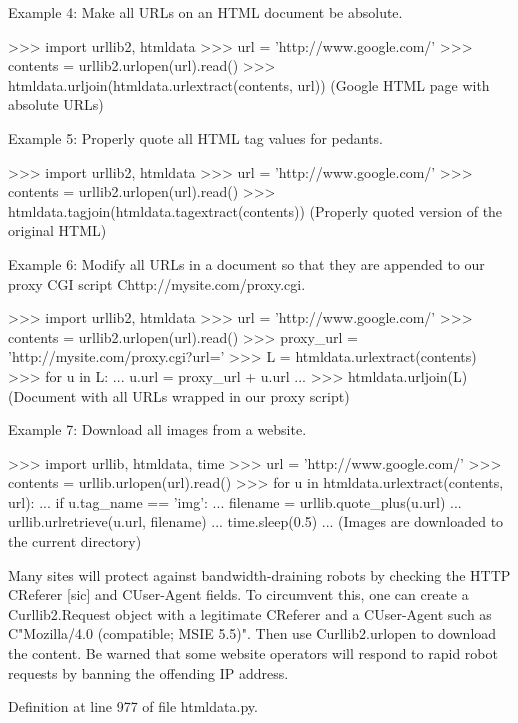 \begin{DoxyVerb}
Example 4:
Make all URLs on an HTML document be absolute.

 >>> import urllib2, htmldata
 >>> url = 'http://www.google.com/'
 >>> contents = urllib2.urlopen(url).read()
 >>> htmldata.urljoin(htmldata.urlextract(contents, url))
 (Google HTML page with absolute URLs)

Example 5:
Properly quote all HTML tag values for pedants.

 >>> import urllib2, htmldata
 >>> url = 'http://www.google.com/'
 >>> contents = urllib2.urlopen(url).read()
 >>> htmldata.tagjoin(htmldata.tagextract(contents))
 (Properly quoted version of the original HTML)

Example 6:
Modify all URLs in a document so that they are appended
to our proxy CGI script C{http://mysite.com/proxy.cgi}.

 >>> import urllib2, htmldata
 >>> url = 'http://www.google.com/'
 >>> contents = urllib2.urlopen(url).read()
 >>> proxy_url = 'http://mysite.com/proxy.cgi?url='
 >>> L = htmldata.urlextract(contents)
 >>> for u in L:
 ...   u.url = proxy_url + u.url
 ...
 >>> htmldata.urljoin(L)
 (Document with all URLs wrapped in our proxy script)

Example 7:
Download all images from a website.

 >>> import urllib, htmldata, time
 >>> url = 'http://www.google.com/'
 >>> contents = urllib.urlopen(url).read()
 >>> for u in htmldata.urlextract(contents, url):
 ...   if u.tag_name == 'img':
 ...     filename = urllib.quote_plus(u.url)
 ...     urllib.urlretrieve(u.url, filename)
 ...     time.sleep(0.5)
 ...
 (Images are downloaded to the current directory)

Many sites will protect against bandwidth-draining robots by
checking the HTTP C{Referer} [sic] and C{User-Agent} fields.
To circumvent this, one can create a C{urllib2.Request} object
with a legitimate C{Referer} and a C{User-Agent} such as
C{"Mozilla/4.0 (compatible; MSIE 5.5)"}.  Then use
C{urllib2.urlopen} to download the content.  Be warned that some
website operators will respond to rapid robot requests by banning
the offending IP address.\end{DoxyVerb}
 

Definition at line 977 of file htmldata.\+py.


